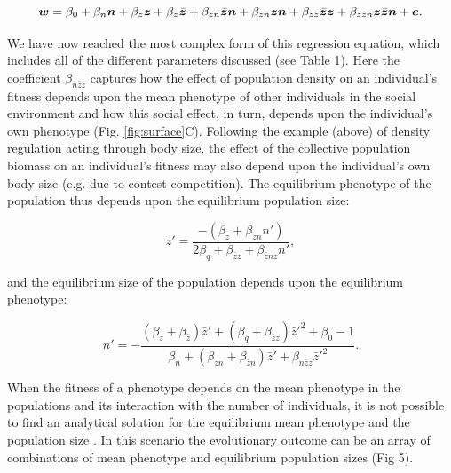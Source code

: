 \documentclass{article}
\begin{document}
\begin{equation} 
\vectorsym{w}=\beta_{0} +\beta_{n} \vectorsym{n} + \beta_{z} \vectorsym{z}+ \beta_{\bar{z}} \vectorsym{\bar{z}}  +   \beta_{\bar{z}n} \vectorsym{\bar{z}n} +   \beta_{zn} \vectorsym{zn} + \beta_{\bar{z}z} \vectorsym{\bar{z}z}   +   \beta_{\bar{z}zn} \vectorsym{z\bar{z}n} + \vectorsym{e}.
\end{equation}

\noindent We have now reached the most complex form of this regression equation, which includes all of the different parameters discussed (see Table 1). Here the coefficient $\beta_{n\bar{z}z}$ captures how the effect of population density on an individual's fitness depends upon the mean phenotype of other individuals in the social environment and how this social effect, in turn, depends upon the individual's own phenotype (Fig. \ref{fig:surface}C). Following the example (above) of density regulation acting through body size, the effect of the collective population biomass on an individual's fitness may also depend upon the individual's own body size (e.g. due to contest competition). The equilibrium phenotype of the population thus depends upon the equilibrium population size: 

\begin{equation} 
z'=\frac{-(\beta_{z}+\beta_{zn}n')}{2\beta_{q} + \beta_{\bar{z}z} + \beta_{\bar{z}nz}n'},
\end{equation} 

\noindent and the equilibrium size of the population depends upon the equilibrium phenotype:

\begin{equation}  \label{eq: full}
	n' = -\frac{(\beta_{z}  +  \beta_{\bar{z}})\bar{z}' + (\beta_{q} + \beta_{\bar{z}z})\bar{z}'^2 +\beta_{0} -1}{\beta_{n} + (\beta_{zn} + \beta_{\bar{z}n}) \bar{z}' +  \beta_{n\bar{z}z}\bar{z}'^2}.
\end{equation}

When the fitness of a phenotype depends on the mean phenotype in the populations and its interaction with the number of individuals, it is not possible to find an analytical solution for the equilibrium mean phenotype and the population size \citep{Engen2020}. In this scenario the evolutionary outcome can be an array of combinations of mean phenotype and equilibrium population sizes (Fig 5).
\end{document}
